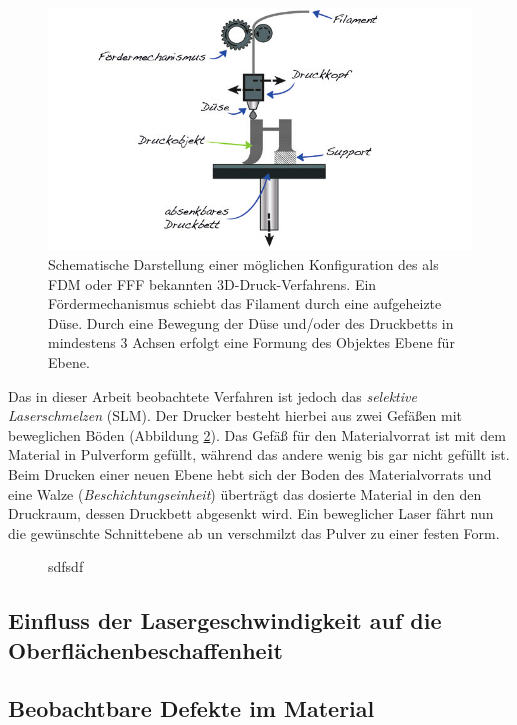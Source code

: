 		\begin{figure}
			\centering
			\includegraphics[width=\textwidth]{chapter/main/img/FDM.png}
			\caption{Schematische Darstellung einer möglichen Konfiguration des als FDM oder FFF
			bekannten 3D-Druck-Verfahrens. Ein Fördermechanismus schiebt das Filament durch eine
			aufgeheizte Düse. Durch eine Bewegung der Düse und/oder des Druckbetts in mindestens 3
			Achsen erfolgt eine Formung des Objektes Ebene für Ebene. \cite[S. 114]{horsch20143d}}
			\label{fig:fdm}
		\end{figure}

		Das in dieser Arbeit beobachtete Verfahren ist jedoch das \emph{selektive Laserschmelzen}
		(SLM). Der Drucker besteht hierbei aus zwei Gefäßen mit beweglichen Böden (Abbildung
		\ref{fig:slm_sls}). Das Gefäß für den Materialvorrat ist mit dem Material in Pulverform
		gefüllt, während das andere wenig bis gar nicht gefüllt ist. Beim Drucken einer neuen Ebene
		hebt sich der Boden des Materialvorrats und eine Walze (\emph{Beschichtungseinheit}) überträgt
		das dosierte Material in den den Druckraum, dessen Druckbett abgesenkt wird. Ein beweglicher
		Laser fährt nun die gewünschte Schnittebene ab un verschmilzt das Pulver zu einer festen Form.

		\begin{figure}
			\centering
			\caption{sdfsdf}
			\label{fig:slm_sls}
		\end{figure}

	\subsection{Einfluss der Lasergeschwindigkeit auf die Oberflächenbeschaffenheit}
	\subsection{Beobachtbare Defekte im Material}


